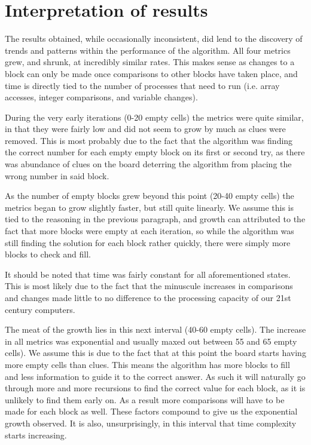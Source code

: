 \documentclass{article}
\begin{document}
	\clearpage
    \pagebreak
    \section{Interpretation of results}
    The results obtained, while occasionally inconsistent, did lend to the discovery of trends and patterns within the performance of the algorithm. All four metrics grew, and shrunk, at incredibly similar rates. This makes sense as changes to a block can only be made once comparisons to other blocks have taken place, and time is directly tied to the number of processes that need to run (i.e. array accesses, integer comparisons, and variable changes). 
        

    During the very early iterations (0-20 empty cells) the metrics were quite similar, in that they were fairly low and did not seem to grow by much as clues were removed. This is most probably due to the fact that the algorithm was finding the correct number for each empty empty block on its first or second try, as there was abundance of clues on the board deterring the algorithm from placing the wrong number in said block. 
    
 
    As the number of empty blocks grew beyond this point (20-40  empty cells) the metrics began to grow slightly faster, but still quite linearly. We assume this is tied to the reasoning in the previous paragraph, and growth can attributed to the fact that more blocks were empty at each iteration, so while the algorithm was still finding the solution for each block rather quickly, there were simply more blocks to check and fill.


    It should be noted that time was fairly constant for all aforementioned states. This is most likely due to the fact that the minuscule increases in comparisons and changes made little to no difference to the processing capacity of our 21st century computers.


    The meat of the growth lies in this next interval (40-60 empty cells). The increase in all metrics was exponential and usually maxed out between 55 and 65 empty cells). We assume this is due to the fact that at this point the board starts having more empty cells than clues. This means the algorithm has more blocks to fill and less information to guide it to the correct answer. As such it will naturally go through more and more recursions to find the correct value for each block, as it is unlikely to find them early on. As a result more comparisons will have to be made for each block as well. These factors compound to give us the exponential growth observed. It is also, unsurprisingly, in this interval that time complexity starts increasing.
\end{document}
